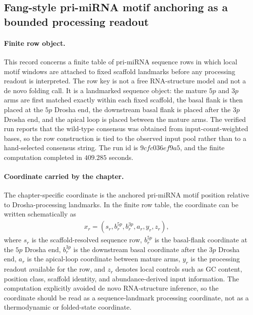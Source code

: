 
\subsection{Fang-style pri-miRNA motif anchoring as a bounded processing readout}
\label{subsec:bioreality-primirna-motif-drosha-processing-fang2015}

\paragraph{Finite row object.}
This record concerns a finite table of pri-miRNA sequence rows in which local motif windows are attached to fixed scaffold landmarks before any processing readout is interpreted. The row key is not a free RNA-structure model and not a de novo folding call. It is a landmarked sequence object: the mature $5p$ and $3p$ arms are first matched exactly within each fixed scaffold, the basal flank is then placed at the $5p$ Drosha end, the downstream basal flank is placed after the $3p$ Drosha end, and the apical loop is placed between the mature arms. The verified run reports that the wild-type consensus was obtained from input-count-weighted bases, so the row construction is tied to the observed input pool rather than to a hand-selected consensus string. The run id is $9cfc036ef9a5$, and the finite computation completed in $409.285$ seconds.

\paragraph{Coordinate carried by the chapter.}
The chapter-specific coordinate is the anchored pri-miRNA motif position relative to Drosha-processing landmarks. In the finite row table, the coordinate can be written schematically as
$$
\begin{aligned}
  x_r = (s_r, b^{5p}_r, b^{3p}_r, a_r, y_r, z_r),
\end{aligned}
$$
where $s_r$ is the scaffold-resolved sequence row, $b^{5p}_r$ is the basal-flank coordinate at the $5p$ Drosha end, $b^{3p}_r$ is the downstream basal coordinate after the $3p$ Drosha end, $a_r$ is the apical-loop coordinate between mature arms, $y_r$ is the processing readout available for the row, and $z_r$ denotes local controls such as GC content, position class, scaffold identity, and abundance-derived input information. The computation explicitly avoided de novo RNA-structure inference, so the coordinate should be read as a sequence-landmark processing coordinate, not as a thermodynamic or folded-state coordinate.

